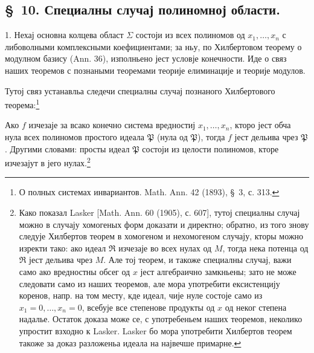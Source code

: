 ﻿\documentclass[11pt]{article}
\newcommand{\ideal}[1]{\mathfrak{#1}}
\begin{document}

\setcounter{footnote}{38}
\subsection*{\S~10. Специалны случај полиномној области.}

1. Нехај основна колцева област \(\Sigma\) состоји из всех полиномов од \(x_1,
\ldots,x_n\) с либоволными комплексными коефициентами; за ньу, по Хилбертовом теорему о модулном базису (Ann. 36), изполньено јест условје конечности. Иде о связ наших теоремов с познаными теоремами теорије елиминације и теорије модулов.

Тутој связ устанавльа следечи специалны случај познаного Хилбертового теорема:\footnote{О полных системах инвариантов. Math. Ann. 42 (1893), \S~3, с. 313.}

Ако \(f\) изчезаје за всако конечно система вредностиј \(x_1,
\ldots,x_n\), кторо јест обча нула всех полиномов простого идеала \(\ideal P\) (нула од \(\ideal P\)), тогда \(f\) јест дельива чрез \(\ideal P\). Другими словами: просты идеал \(\ideal P\) состоји из целости полиномов, кторе изчезајут в јего нулах.\footnote{Како показал Lasker [Math. Ann. 60 (1905), с. 607], тутој специалны случај можно в случају хомогеных форм доказати и директно; обратно, из того знову следује Хилбертов теорем в хомогеном и нехомогеном случају, кторы можно изректи тако: ако идеал \(\ideal R\) изчезаје во всех нулах од \(M\), тогда нека потенца од \(\ideal R\) јест дельива чрез \(M\). Але тој теорем, и такоже специалны случај, важи само ако вредностны обсег од \(x\) јест алгебраично замкньены; зато не може следовати само из наших теоремов, але мора употребити ексистенцију коренов, напр. на том месту, кде идеал, чије нуле состоје само из \(x_1=0,
\ldots,x_n=0\), всебује все степенове продукты од \(x\) од неког степена надалье. Остаток доказа може се, с употребеньем наших теоремов, неколико упростит взходно к Lasker. Lasker бо мора употребити Хилбертов теорем такоже за доказ разложеньа идеала на највечше примарне.}
\end{document}
